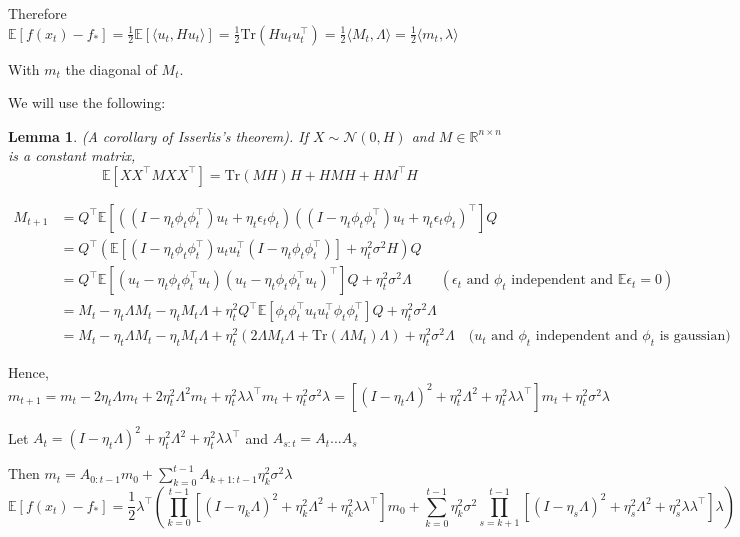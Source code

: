 \documentclass{article}
\newcommand{\R}{\mathbb{R}}
\newcommand{\E}{\mathbb{E}}
\newcommand{\tr}{\mathrm{Tr}}
\newtheorem{lemma}{Lemma}
\begin{document}
\bigskip


Therefore $\E[f(x_t)-f_*] = \frac{1}{2}\E[\langle u_t, Hu_t\rangle] = \frac{1}{2}\tr(Hu_tu_t^\top)=\frac{1}{2}\langle M_t, \Lambda \rangle =\frac{1}{2}\langle  m_t , \lambda \rangle$

With $m_t$ the diagonal of $M_t$.

We will use the following:

\begin{lemma} (A corollary of Isserlis's theorem). If $X\sim \mathcal N(0,H)$ and $M \in \R^{n\times n}$ is a constant matrix,
\[
\E[XX^\top M XX^\top] = \tr(MH)H + HMH+ H M^\top H
\]
\end{lemma}

\begin{align*}
M_{t+1} &= Q^\top \E[((I-\eta_t \phi_t \phi_t^\top)u_t + \eta_t \epsilon_t \phi_t)((I-\eta_t \phi_t \phi_t^\top)u_t + \eta_t \epsilon_t \phi_t)^\top] Q\\
&= Q^\top (\E[(I-\eta_t \phi_t \phi_t^\top)u_tu_t^\top (I-\eta_t \phi_t \phi_t^\top)]+\eta_t^2\sigma^2H)Q\\
&= Q^\top \E[ (u_t-\eta_t\phi_t\phi_t^\top u_t)(u_t-\eta_t\phi_t\phi_t^\top u_t)^\top] Q + \eta_t^2\sigma^2\Lambda \qquad (\text{$\epsilon_t$ and $\phi_t$ independent and $\E\epsilon_t =0$})\\
&= M_t - \eta_t \Lambda M_t - \eta_t M_t \Lambda + \eta_t^2 Q^\top \E[\phi_t \phi_t^\top u_t u_t^\top \phi_t\phi_t^\top]Q + \eta_t^2\sigma^2\Lambda\\
&=  M_t - \eta_t \Lambda M_t - \eta_t M_t \Lambda + \eta_t^2 (2 \Lambda M_t \Lambda + \tr(\Lambda M_t)\Lambda) + \eta_t^2\sigma^2\Lambda \quad \text{($u_t$ and $\phi_t$ independent and $\phi_t$ is gaussian)}
\end{align*}


Hence, $m_{t+1} =  m_t - 2\eta_t \Lambda m_t + 2\eta_t^2  \Lambda^2 m_t + \eta_t^2 \lambda \lambda^\top m_t + \eta_t^2\sigma^2\lambda = \left[(I - \eta_t\Lambda)^2 + \eta_t^2 \Lambda^2 + \eta_t^2\lambda\lambda^\top \right] m_t + \eta_t^2 \sigma^2 \lambda$

Let $A_t = (I - \eta_t\Lambda)^2 + \eta_t^2 \Lambda^2+\eta_t^2\lambda\lambda^\top $ and $A_{s:t} = A_t...A_s$

\bigskip 
Then $\displaystyle m_t = A_{0:{t-1}}m_0 + \sum_{k=0}^{t-1} A_{k+1:t-1}\eta_k^2\sigma^2\lambda$
\[
\E[f(x_t) - f_*] = \frac{1}{2}\lambda^\top \left( \prod_{k=0}^{t-1}[(I - \eta_k\Lambda)^2 + \eta_k^2 \Lambda^2+\eta_k^2\lambda\lambda^\top]m_0 + \sum_{k=0}^{t-1}\eta_k^2\sigma^2 \prod_{s=k+1}^{t-1}[(I - \eta_s\Lambda)^2 + \eta_s^2 \Lambda^2+\eta_s^2\lambda\lambda^\top]\lambda  \right)
\]
\end{document}

